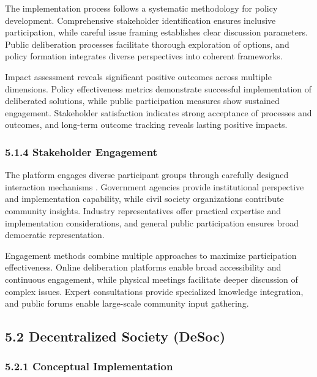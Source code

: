 The implementation process follows a systematic methodology for policy development. Comprehensive stakeholder identification ensures inclusive participation, while careful issue framing establishes clear discussion parameters. Public deliberation processes facilitate thorough exploration of options, and policy formation integrates diverse perspectives into coherent frameworks.

Impact assessment reveals significant positive outcomes across multiple dimensions. Policy effectiveness metrics demonstrate successful implementation of deliberated solutions, while public participation measures show sustained engagement. Stakeholder satisfaction indicates strong acceptance of processes and outcomes, and long-term outcome tracking reveals lasting positive impacts.

\hypertarget{stakeholder-engagement}{%
\subsubsection{5.1.4 Stakeholder Engagement}\label{stakeholder-engagement}}

The platform engages diverse participant groups through carefully designed interaction mechanisms \citep{vtaiwan2023}. Government agencies provide institutional perspective and implementation capability, while civil society organizations contribute community insights. Industry representatives offer practical expertise and implementation considerations, and general public participation ensures broad democratic representation.

Engagement methods combine multiple approaches to maximize participation effectiveness. Online deliberation platforms enable broad accessibility and continuous engagement, while physical meetings facilitate deeper discussion of complex issues. Expert consultations provide specialized knowledge integration, and public forums enable large-scale community input gathering.

\hypertarget{decentralized-society-desoc}{%
\subsection{5.2 Decentralized Society (DeSoc)}\label{decentralized-society-desoc}}

\hypertarget{conceptual-implementation}{%
\subsubsection{5.2.1 Conceptual Implementation}\label{conceptual-implementation}}

